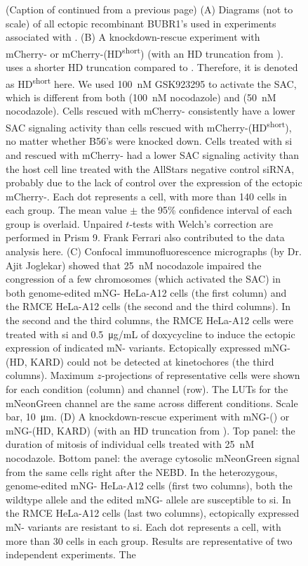 \begin{figure}
  \noindent\justifying (Caption of  continued from a previous page) (A) Diagrams (not to scale) of all ectopic recombinant BUBR1's used in experiments associated with . (B) A  knockdown-rescue experiment with mCherry- or mCherry-(\textDelta{}HD\textsuperscript{short}) (with an HD truncation from \cite{BubR1TwoPools}). \cite{BubR1TwoPools} uses a shorter HD truncation compared to \cite{BubBiochem}. Therefore, it is denoted as \textDelta{}HD\textsuperscript{short} here. We used \SI{100}{nM} GSK923295 to activate the SAC, which is different from both \cite{BubR1TwoPools} (\SI{100}{nM} nocodazole) and \cite{BubBiochem} (\SI{50}{nM} nocodazole). Cells rescued with mCherry- consistently have a lower SAC signaling activity than cells rescued with mCherry-(\textDelta{}HD\textsuperscript{short}), no matter whether B56's were knocked down. Cells treated with si and rescued with mCherry- had a lower SAC signaling activity than the host cell line treated with the AllStars negative control siRNA, probably due to the lack of control over the expression of the ectopic mCherry-. Each dot represents a cell, with more than 140 cells in each group. The mean value $\pm$ the 95\% confidence interval of each group is overlaid. Unpaired $t$-tests with Welch's correction are performed in Prism 9. Frank Ferrari also contributed to the data analysis here. (C) Confocal immunofluorescence micrographs (by Dr. Ajit Joglekar) showed that \SI{25}{nM} nocodazole impaired the congression of a few chromosomes (which activated the SAC) in both genome-edited mNG- HeLa-A12 cells (the first column) and the RMCE HeLa-A12 cells (the second and the third columns). In the second and the third columns, the RMCE HeLa-A12 cells were treated with si and \SI{0.5}{\micro g/mL} of doxycycline to induce the ectopic expression of indicated mN- variants. Ectopically expressed mNG-(\textDelta{}HD, \textDelta{}KARD) could not be detected at kinetochores (the third columns). Maximum $z$-projections of representative cells were shown for each condition (column) and channel (row). The LUTs for the mNeonGreen channel are the same across different conditions. Scale bar, \SI{10}{\micro m}. (D) A  knockdown-rescue experiment with mNG-() or mNG-(\textDelta{}HD, \textDelta{}KARD) (with an HD truncation from \cite{BubBiochem}). Top panel: the duration of mitosis of individual cells treated with \SI{25}{nM} nocodazole. Bottom panel: the average cytosolic mNeonGreen signal from the same cells right after the NEBD. In the heterozygous, genome-edited mNG- HeLa-A12 cells (first two columns), both the wildtype allele and the edited mNG- allele are susceptible to si. In the RMCE HeLa-A12 cells (last two columns), ectopically expressed mN- variants are resistant to si. Each dot represents a cell, with more than 30 cells in each group. Results are representative of two independent experiments. The 
\end{figure}
